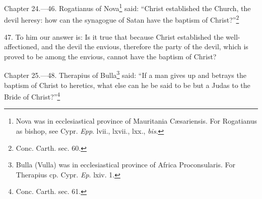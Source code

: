 
Chapter 24.—46. Rogatianus of Nova\footnote{\par  Nova was in ecclesiastical province of Mauritania Cæsariensis. For Rogatianus as bishop, see Cypr. \emph{ Epp}. lvii., lxvii., lxx., \emph{bis}.} said: ``Christ established the Church, the devil heresy: how can the synagogue of Satan have the baptism of Christ?''\footnote{\par  Conc. Carth. sec. 60.}

47. To him our answer is: Is it true that because Christ established the well-affectioned, and the devil the envious, therefore the party of the devil, which is proved to be among the envious, cannot have the baptism of Christ?


Chapter 25.—48. Therapius of Bulla\footnote{\par  Bulla (Vulla) was in ecclesiastical province of Africa Proconsularis. For Therapius cp. Cypr. \emph{Ep}. lxiv. 1.} said: ``If a man gives up and betrays the baptism of Christ to heretics, what else can he be said to be but a Judas to the Bride of Christ?''\footnote{\par  Conc. Carth. sec. 61.}

